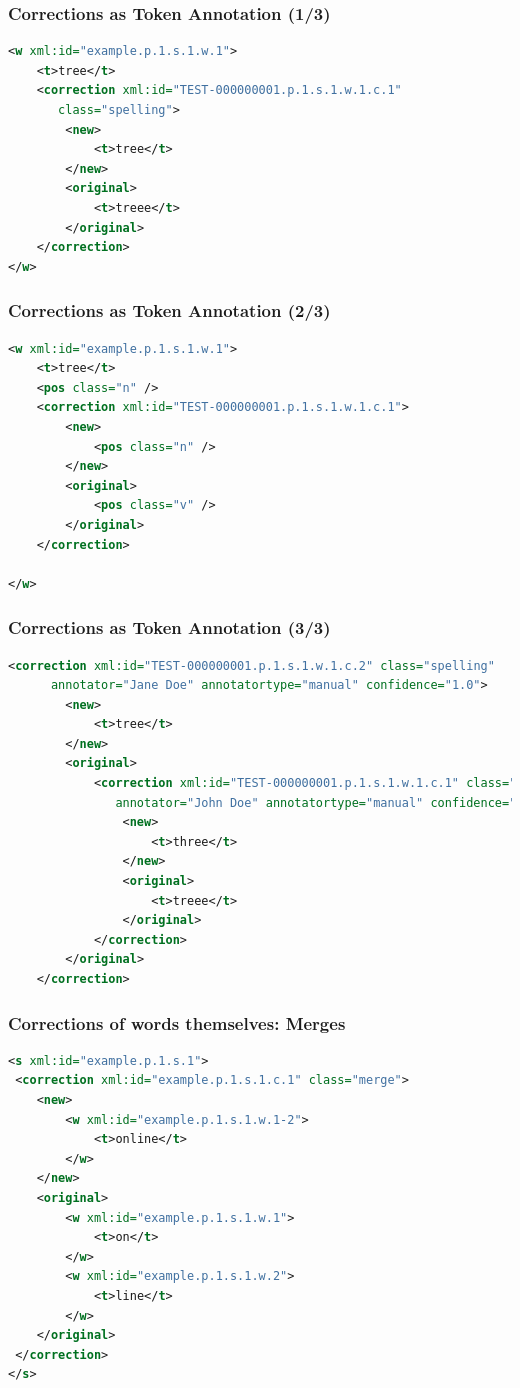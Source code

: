 \documentclass[compress]{beamer}
\begin{document}
        
\begin{frame}[fragile]
\frametitle{Corrections as Token Annotation (1/3)}

\begin{lstlisting}[language=xml]
<w xml:id="example.p.1.s.1.w.1">
    <t>tree</t>
    <correction xml:id="TEST-000000001.p.1.s.1.w.1.c.1"
       class="spelling">
        <new>
            <t>tree</t>
        </new>
        <original>
            <t>treee</t>
        </original>
    </correction>
</w>
\end{lstlisting}                 

\end{frame}


\begin{frame}[fragile]
\frametitle{Corrections as Token Annotation (2/3)}

\begin{lstlisting}[language=xml]
<w xml:id="example.p.1.s.1.w.1">
    <t>tree</t>
    <pos class="n" />
    <correction xml:id="TEST-000000001.p.1.s.1.w.1.c.1">
        <new>
            <pos class="n" />
        </new>
        <original>
            <pos class="v" />
        </original>
    </correction>
    
</w>    
\end{lstlisting}

\end{frame}

\begin{frame}[fragile]
\frametitle{Corrections as Token Annotation (3/3)}

\begin{lstlisting}[language=xml]
    <correction xml:id="TEST-000000001.p.1.s.1.w.1.c.2" class="spelling" 
      annotator="Jane Doe" annotatortype="manual" confidence="1.0">
        <new>
            <t>tree</t>
        </new>
        <original>
            <correction xml:id="TEST-000000001.p.1.s.1.w.1.c.1" class="spelling"
               annotator="John Doe" annotatortype="manual" confidence="0.6">
                <new>
                    <t>three</t>
                </new>
                <original>
                    <t>treee</t>
                </original>
            </correction>
        </original>
    </correction>
\end{lstlisting}

\end{frame}

\begin{frame}[fragile]
\frametitle{Corrections of words themselves: Merges}

\begin{lstlisting}[language=xml]
<s xml:id="example.p.1.s.1">
 <correction xml:id="example.p.1.s.1.c.1" class="merge">
    <new>
        <w xml:id="example.p.1.s.1.w.1-2">    
            <t>online</t>
        </w>
    </new>
    <original>
        <w xml:id="example.p.1.s.1.w.1">
            <t>on</t>
        </w>
        <w xml:id="example.p.1.s.1.w.2">
            <t>line</t>
        </w>                         
    </original>
 </correction>               
</s>
\end{lstlisting} 

\end{frame}
\end{document}
